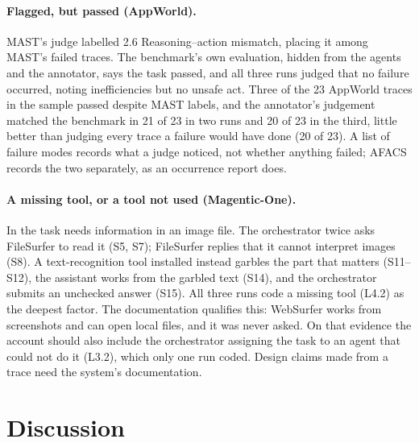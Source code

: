 \documentclass[11pt]{article}
\begin{document}
\paragraph{Flagged, but passed (AppWorld).} MAST's judge labelled
 2.6 Reasoning--action mismatch, placing it
among MAST's failed traces. The benchmark's own evaluation, hidden from the agents
and the annotator, says the task passed, and all three runs judged that no failure
occurred, noting inefficiencies but no unsafe act. Three of the 23 AppWorld traces
in the sample passed despite MAST labels, and the annotator's judgement matched the benchmark in 21 of 23 in two runs and 20 of 23 in the third, little better than judging every trace a failure would have done (20 of 23). A list of failure modes records what a judge noticed, not
whether anything failed; AFACS records the two separately, as an occurrence report
does.

\paragraph{A missing tool, or a tool not used (Magentic-One).} In
 the task needs information in an image file. The
orchestrator twice asks FileSurfer to read it (S5, S7); FileSurfer replies that it
cannot interpret images (S8). A text-recognition tool installed instead garbles the
part that matters (S11--S12), the assistant works from the garbled text (S14), and
the orchestrator submits an unchecked answer (S15). All three runs code a missing
tool (L4.2) as the deepest factor. The documentation qualifies this: WebSurfer
works from screenshots and can open local files, and it was never asked. On that
evidence the account should also include the orchestrator assigning the task to an
agent that could not do it (L3.2), which only one run coded. Design claims made
from a trace need the system's documentation.

\fussy
\section{Discussion}
\end{document}
